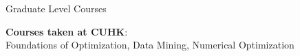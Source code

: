 \begin{rSection}{Graduate Level Courses}

	\textbf{Courses taken at CUHK}:\\	
	Foundations of Optimization, Data Mining, Numerical Optimization
\end{rSection}
